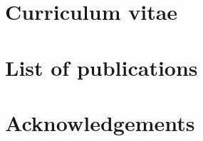 \renewcommand{\bibpreamble}{}
\renewcommand{\bibpostamble}{}
\renewcommand\bibfont{\normalfont\fontsize{8.58}{8}\selectfont}

 \label{ch-6}
\clearpage
\section{Curriculum vitae}
\clearpage
\section{List of publications}
\nocite{*}


\clearpage
\section{Acknowledgements}

